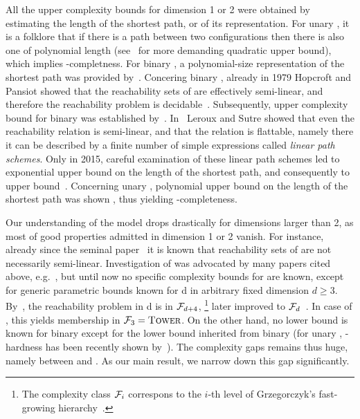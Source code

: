All the upper complexity bounds for dimension 1 or 2 were obtained by estimating
the length of the shortest path, or of its representation.
%
For unary , it is a folklore that if there is a path between two configurations then there is 
also one of polynomial length (see~\cite{DBLP:journals/lmcs/ChistikovCHPW19} for more demanding 
quadratic upper bound), which implies \nl-completness.
For binary , a polynomial-size representation of the shortest path was provided
by~\cite{DBLP:conf/concur/HaaseKOW09}.
%
Concering binary \dvass,
already in 1979 Hopcroft and Pansiot showed that the reachability sets of \dvass
are effectively semi-linear, and therefore the reachability problem is 
decidable~\cite{DBLP:journals/tcs/HopcroftP79}.
Subsequently, \twoexptime upper complexity bound for binary \dvass
was established by~\cite{DBLP:journals/tcs/HowellRHY86}.
In~\cite{DBLP:conf/concur/LerouxS04} Leroux and Sutre showed that even the reachability relation 
is semi-linear, and that the relation
is flattable, namely there it can be described by a finite number of simple expressions called 
\emph{linear path schemes}.
Only in 2015, careful examination of these linear path schemes led to
exponential upper bound on the length of the shortest path, and 
consequently to \pspace upper bound~\cite{BlondinFGHM15}.
%
Concerning unary \dvass, polynomial upper bound on the length of the shortest path was shown
\cite{DBLP:conf/lics/EnglertLT16,DBLP:journals/jacm/BlondinEFGHLMT21},
thus yielding \nl-completeness. 

Our understanding of the model drops drastically for dimensions larger than 2,
as most of good properties admitted in dimension 1 or 2 vanish.
For instance, already since the seminal paper~\cite{DBLP:journals/tcs/HopcroftP79} it is known that
reachability sets of \tvass are not necessarily semi-linear.
Investigation of \tvass was advocated by many papers cited above, 
e.g.~\cite{DBLP:journals/tcs/HopcroftP79,BlondinFGHM15,DBLP:journals/jacm/BlondinEFGHLMT21},
but until now no specific complexity bounds for \tvass are known, except for generic 
parametric bounds known for \parvass d in arbitrary fixed dimension $d\geq 3$.
By~\cite{LS19}, the reachability problem in \parvass d
is in  $\mathcal{F}_{d+4}$,%
\footnote{The complexity class $\mathcal{F}_i$ correspons to the $i$-th level 
of Grzegorczyk's fast-growing hierarchy~\cite{DBLP:journals/toct/Schmitz16}.}
later improved to $\mathcal{F}_d$~\cite{DBLP:conf/icalp/FuYZ24}.
In case of \tvass, this yields membership in $\mathcal{F}_3 = \textsc{Tower}$.
On the other hand, no lower bound is known for binary \tvass except for the \pspace lower bound 
inherited from binary \dvass
(for unary \tvass, \np-hardness has been recently shown by~\cite{DBLP:conf/focs/0001CMOSW24}).
The complexity gaps remains thus huge, namely between \pspace and \tower.
As our main result, we narrow down this gap significantly.

